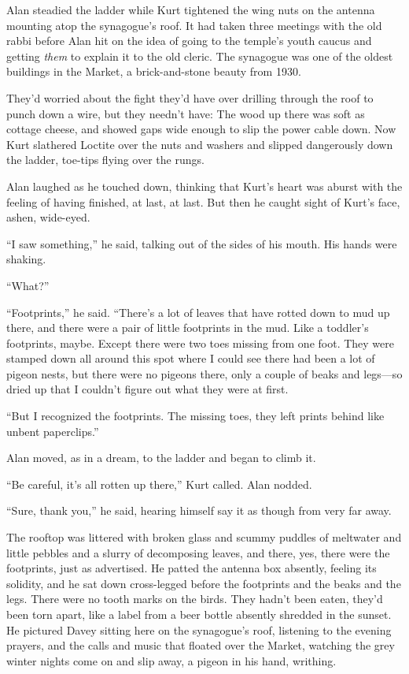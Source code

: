 Alan steadied the ladder while Kurt tightened the wing nuts on the
antenna mounting atop the synagogue's roof.  It had taken three
meetings with the old rabbi before Alan hit on the idea of going to
the temple's youth caucus and getting \textit{them} to explain it to
the old cleric.  The synagogue was one of the oldest buildings in the
Market, a brick-and-stone beauty from 1930.

They'd worried about the fight they'd have over drilling through the
roof to punch down a wire, but they needn't have:  The wood up there
was soft as cottage cheese, and showed gaps wide enough to slip the
power cable down.  Now Kurt slathered Loctite over the nuts and
washers and slipped dangerously down the ladder, toe-tips flying over
the rungs.

Alan laughed as he touched down, thinking that Kurt's heart was aburst
with the feeling of having finished, at last, at last.  But then he
caught sight of Kurt's face, ashen, wide-eyed.

``I saw something,'' he said, talking out of the sides of his mouth. 
His hands were shaking.

``What?''

``Footprints,'' he said.  ``There's a lot of leaves that have rotted
down to mud up there, and there were a pair of little footprints in
the mud.  Like a toddler's footprints, maybe.  Except there were two
toes missing from one foot.  They were stamped down all around this
spot where I could see there had been a lot of pigeon nests, but there
were no pigeons there, only a couple of beaks and legs---so dried up
that I couldn't figure out what they were at first.

``But I recognized the footprints.  The missing toes, they left prints
behind like unbent paperclips.''

Alan moved, as in a dream, to the ladder and began to climb it.

``Be careful, it's all rotten up there,'' Kurt called.  Alan nodded.

``Sure, thank you,'' he said, hearing himself say it as though from
very far away.

The rooftop was littered with broken glass and scummy puddles of
meltwater and little pebbles and a slurry of decomposing leaves, and
there, yes, there were the footprints, just as advertised.  He patted
the antenna box absently, feeling its solidity, and he sat down
cross-legged before the footprints and the beaks and the legs.  There
were no tooth marks on the birds.  They hadn't been eaten, they'd been
torn apart, like a label from a beer bottle absently shredded in the
sunset.  He pictured Davey sitting here on the synagogue's roof,
listening to the evening prayers, and the calls and music that floated
over the Market, watching the grey winter nights come on and slip
away, a pigeon in his hand, writhing.

